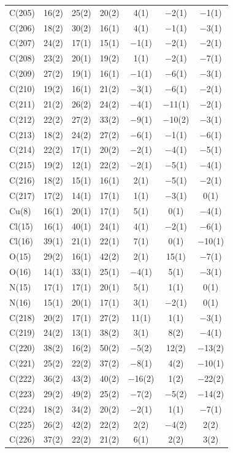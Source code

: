 \begin{center}
{\begin{supertabular}{lcccccc}
C(205)&16(2) &25(2)&20(2) &4(1)&$-$2(1) &$-$1(1)\\
C(206)&18(2) &30(2)&16(1) &4(1)&$-$1(1) &$-$3(1)\\
C(207)&24(2) &17(1)&15(1) &$-$1(1)&$-$2(1) &$-$2(1)\\
C(208)&23(2) &20(1)&19(2) &1(1)&$-$2(1) &$-$7(1)\\
C(209)&27(2) &19(1)&16(1) &$-$1(1)&$-$6(1) &$-$3(1)\\
C(210)&19(2) &16(1)&21(2) &$-$3(1)&$-$6(1) &$-$2(1)\\
C(211)&21(2) &26(2)&24(2) &$-$4(1)&$-$11(1) &$-$2(1)\\
C(212)&22(2) &27(2)&33(2) &$-$9(1)&$-$10(2) &$-$3(1)\\
C(213)&18(2) &24(2)&27(2) &$-$6(1)&$-$1(1) &$-$6(1)\\
C(214)&22(2) &17(1)&20(2) &$-$2(1)&$-$4(1) &$-$5(1)\\
C(215)&19(2) &12(1)&22(2) &$-$2(1)&$-$5(1) &$-$4(1)\\
C(216)&18(2) &15(1)&16(1) &2(1)&$-$5(1) &$-$2(1)\\
C(217)&17(2) &14(1)&17(1) &1(1)&$-$3(1) &0(1)\\
Cu(8)&16(1) &20(1)&17(1) &5(1)&0(1) &$-$4(1)\\
Cl(15)&16(1) &40(1)&24(1) &4(1)&$-$2(1) &$-$6(1)\\
Cl(16)&39(1) &21(1)&22(1) &7(1)&0(1) &$-$10(1)\\
O(15)&29(2) &16(1)&42(2) &2(1)&15(1) &$-$7(1)\\
O(16)&14(1) &33(1)&25(1) &$-$4(1)&5(1) &$-$3(1)\\
N(15)&17(1) &17(1)&20(1) &5(1)&1(1) &0(1)\\
N(16)&15(1) &20(1)&17(1) &3(1)&$-$2(1) &0(1)\\
C(218)&20(2) &17(1)&27(2) &11(1)&1(1) &$-$3(1)\\
C(219)&24(2) &13(1)&38(2) &3(1)&8(2) &$-$4(1)\\
C(220)&38(2) &16(2)&50(2) &$-$5(2)&12(2) &$-$13(2)\\
C(221)&25(2) &22(2)&37(2) &$-$8(1)&4(2) &$-$10(1)\\
C(222)&36(2) &43(2)&40(2) &$-$16(2)&1(2) &$-$22(2)\\
C(223)&29(2) &49(2)&25(2) &$-$7(2)&$-$5(2) &$-$14(2)\\
C(224)&18(2) &34(2)&20(2) &$-$2(1)&1(1) &$-$7(1)\\
C(225)&26(2) &42(2)&22(2) &2(2)&$-$4(2) &2(2)\\
C(226)&37(2) &22(2)&21(2) &6(1)&2(2) &3(2)\\

\end{supertabular}}
\end{center}

